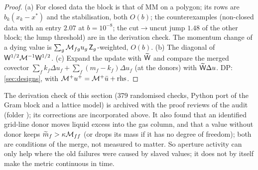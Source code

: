 \begin{proof}
(a) For closed data the block is that of MM on a polygon; its rows are $b_k(x_k-x^*)$ and the
stabilisation, both $O(b)$; the counterexamples (non-closed data with an entry $2.07$ at
$b=10^{-8}$; the cut$\to$uncut jump $1.48$ of the other block; the lump threshold) are in the
derivation check.  The momentum change of a dying value is $\sum_g\mathcal M_{fg}u_g\,\mathsf Z_g$-weighted,
$O(b)$.  (b) The diagonal of $\mathsf W^{1/2}\mathcal M^{-1}\mathsf W^{1/2}$.  (c) Expand the update with
$\widetilde{\mathsf W}$ and compare the merged covector $\sum_f k_f\Delta u_f+\sum_f(m_f-k_f)\Delta u_f$
(at the donors) with $\widetilde{\mathsf W}\Delta u$.  DP: \cref{sec:designs}, with
$\mathcal M^+u^+=\mathcal M^+\bar u+\text{rhs}$.
\end{proof}
The derivation check of this section (379 randomised checks, Python port of the Gram block and a
lattice model) is archived with the proof reviews of the audit (folder
\allowbreak{}); its corrections are incorporated above.  It also
found that an identified grid-line donor moves liquid excess into the gas column, and that a
value without donor keeps $\widetilde m_f>\kappa\mathcal M_{ff}$ (or drops its mass if it has no
degree of freedom); both are conditions of the merge, not measured to matter.
So aperture activity can only help where the old failures were caused by slaved values; it
does not by itself make the metric continuous in time.
